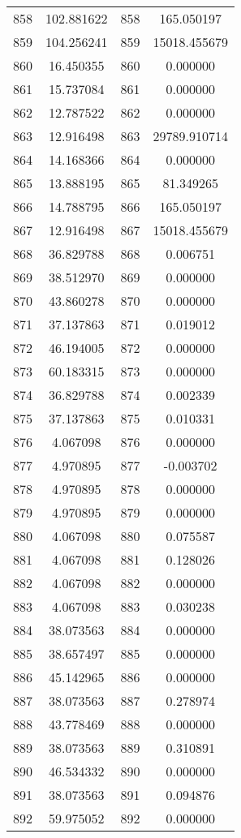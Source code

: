 \documentclass[12pt]{article}
\begin{document}
\begin{longtable}{@{}cccc@{}}
858 & 102.881622 & 858 & 165.050197 \\
859 & 104.256241 & 859 & 15018.455679 \\
860 & 16.450355 & 860 & 0.000000 \\
861 & 15.737084 & 861 & 0.000000 \\
862 & 12.787522 & 862 & 0.000000 \\
863 & 12.916498 & 863 & 29789.910714 \\
864 & 14.168366 & 864 & 0.000000 \\
865 & 13.888195 & 865 & 81.349265 \\
866 & 14.788795 & 866 & 165.050197 \\
867 & 12.916498 & 867 & 15018.455679 \\
868 & 36.829788 & 868 & 0.006751 \\
869 & 38.512970 & 869 & 0.000000 \\
870 & 43.860278 & 870 & 0.000000 \\
871 & 37.137863 & 871 & 0.019012 \\
872 & 46.194005 & 872 & 0.000000 \\
873 & 60.183315 & 873 & 0.000000 \\
874 & 36.829788 & 874 & 0.002339 \\
875 & 37.137863 & 875 & 0.010331 \\
876 & 4.067098 & 876 & 0.000000 \\
877 & 4.970895 & 877 & -0.003702 \\
878 & 4.970895 & 878 & 0.000000 \\
879 & 4.970895 & 879 & 0.000000 \\
880 & 4.067098 & 880 & 0.075587 \\
881 & 4.067098 & 881 & 0.128026 \\
882 & 4.067098 & 882 & 0.000000 \\
883 & 4.067098 & 883 & 0.030238 \\
884 & 38.073563 & 884 & 0.000000 \\
885 & 38.657497 & 885 & 0.000000 \\
886 & 45.142965 & 886 & 0.000000 \\
887 & 38.073563 & 887 & 0.278974 \\
888 & 43.778469 & 888 & 0.000000 \\
889 & 38.073563 & 889 & 0.310891 \\
890 & 46.534332 & 890 & 0.000000 \\
891 & 38.073563 & 891 & 0.094876 \\
892 & 59.975052 & 892 & 0.000000 \\

\end{longtable}
\end{document}
